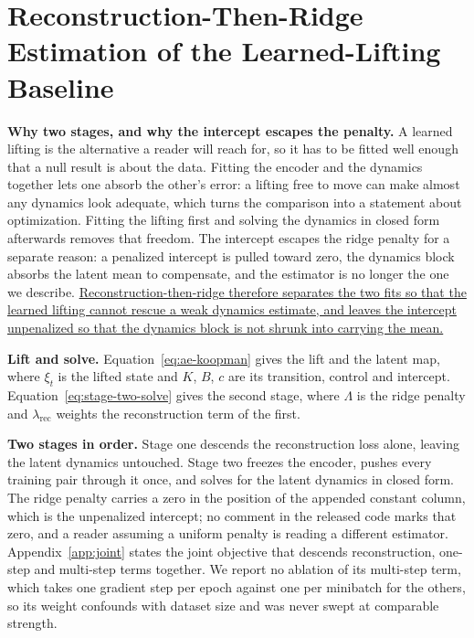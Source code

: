 \section{Reconstruction-Then-Ridge Estimation of the Learned-Lifting Baseline}
\label{app:estimator}

\textbf{Why two stages, and why the intercept escapes the penalty.} A learned lifting is the
alternative a reader will reach for, so it has to be fitted well enough that a null result is
about the data. Fitting the encoder and the dynamics together lets one absorb the other's
error: a lifting free to move can make almost any dynamics look adequate, which turns the
comparison into a statement about optimization. Fitting the lifting first and solving the
dynamics in closed form afterwards removes that freedom. The intercept escapes the ridge
penalty for a separate reason: a penalized intercept is pulled toward zero, the dynamics block
absorbs the latent mean to compensate, and the estimator is no longer the one we describe.
\uline{Reconstruction-then-ridge therefore separates the two fits so that the learned lifting
cannot rescue a weak dynamics estimate, and leaves the intercept unpenalized so that the
dynamics block is not shrunk into carrying the mean.}

\textbf{Lift and solve.} Equation~\eqref{eq:ae-koopman} gives the lift and the latent map,
where $\xi_t$ is the lifted state and $K$, $B$, $c$ are its transition, control and intercept.
Equation~\eqref{eq:stage-two-solve} gives the second stage, where $\Lambda$ is the ridge
penalty and $\lambda_{\mathrm{rec}}$ weights the reconstruction term of the first.

\textbf{Two stages in order.} Stage one descends the reconstruction loss alone, leaving the
latent dynamics untouched. Stage two freezes the encoder, pushes every training pair through it
once, and solves for the latent dynamics in closed form. The ridge penalty carries a zero in the
position of the appended constant column, which is the unpenalized intercept; no comment in the
released code marks that zero, and a reader assuming a uniform penalty is reading a different
estimator. Appendix~\ref{app:joint} states the joint objective that descends reconstruction,
one-step and multi-step terms together. We report no ablation of its multi-step term, which
takes one gradient step per epoch against one per minibatch for the others, so its weight
confounds with dataset size and was never swept at comparable strength.
